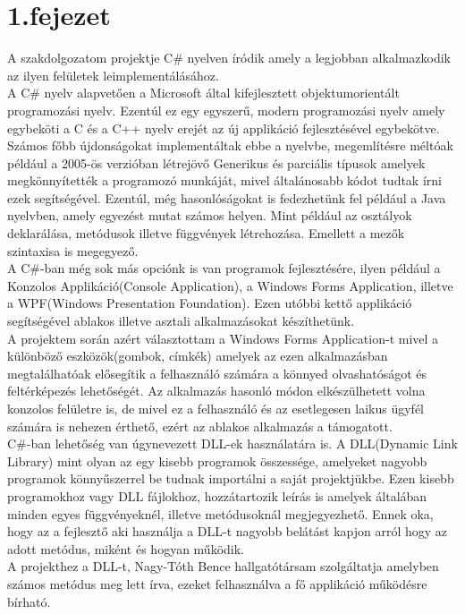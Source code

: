 \documentclass[tocnopagenum]{thesis-ekf}
\theoremstyle{definition}
\theoremstyle{remark}
\begin{document}
	\chapter*{1.fejezet}
	A szakdolgozatom projektje C\# nyelven íródik amely a legjobban alkalmazkodik az ilyen felületek leimplementálásához. \\
	A C\# nyelv alapvetően a Microsoft által kifejlesztett objektumorientált programozási nyelv.
	Ezentúl ez egy egyszerű, modern programozási nyelv amely egybeköti a C és a C++ nyelv erejét az új applikáció fejlesztésével egybekötve. \cite{hejlsberg2003c}
	\\ 
	Számos főbb újdonságokat implementáltak ebbe a nyelvbe, megemlítésre méltóak például a 2005-ös verzióban létrejövő Generikus és parciális típusok amelyek megkönnyítették a programozó munkáját, mivel általánosabb kódot tudtak írni ezek segítségével.
	Ezentúl, még hasonlóságokat is fedezhetünk fel például a Java nyelvben, amely egyezést mutat számos helyen.
	Mint például az osztályok deklarálása, metódusok illetve függvények létrehozása. Emellett a mezők szintaxisa is megegyező.
	\\
	A C\#-ban még sok más opciónk is van programok fejlesztésére, ilyen például a Konzolos Applikáció(Console Application), a Windows Forms Application, illetve a WPF(Windows Presentation Foundation). Ezen utóbbi kettő applikáció segítségével ablakos illetve asztali alkalmazásokat készíthetünk.
	\\
	A projektem során azért választottam a Windows Forms Application-t mivel a különböző eszközök(gombok, címkék) amelyek az ezen alkalmazásban megtalálhatóak elősegítik a felhasználó számára a könnyed olvashatóságot és feltérképezés lehetőségét. Az alkalmazás hasonló módon elkészülhetett volna konzolos felületre is, de mivel ez a felhasználó és az esetlegesen laikus ügyfél számára is nehezen érthető, ezért az ablakos alkalmazás a támogatott.
	\\ 
	C\#-ban lehetőség van úgynevezett DLL-ek használatára is. A DLL(Dynamic Link Library) mint olyan az egy kisebb programok összessége, amelyeket nagyobb programok könnyűszerrel be tudnak importálni a saját projektjükbe. Ezen kisebb programokhoz vagy DLL fájlokhoz, hozzátartozik leírás is amelyek általában minden egyes függvényeknél, illetve metódusoknál megjegyezhető. Ennek oka, hogy az a fejlesztő aki használja a DLL-t
	nagyobb belátást kapjon arról hogy az adott metódus, miként és hogyan működik.
	\\
	A projekthez a DLL-t, Nagy-Tóth Bence hallgatótársam szolgáltatja amelyben számos metódus meg lett írva, ezeket felhasználva a fő applikáció működésre bírható.
\end{document}
